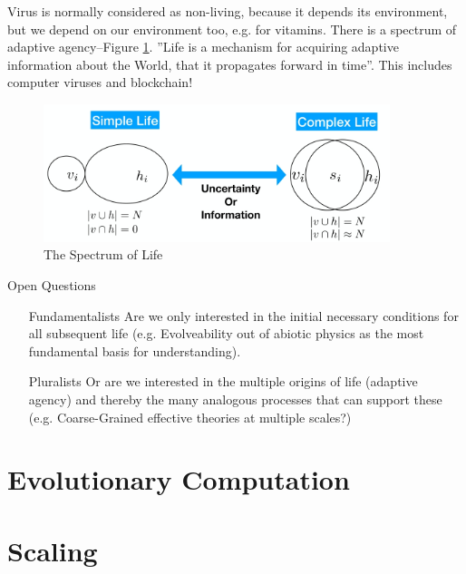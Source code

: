 \documentclass[]{article}
\begin{document}
 Virus is normally considered as non-living, because it depends its environment, but we depend on our environment too, e.g. for vitamins. There is a spectrum of adaptive agency--Figure \ref{fig:SpectrumOfLife}.  ''Life is a mechanism for acquiring adaptive information about the World, that it propagates forward in time''. This includes computer viruses and blockchain!
 
\begin{figure}[H]
	\caption{The Spectrum of Life}\label{fig:SpectrumOfLife}
	\includegraphics[width=0.9\textwidth]{SpectrumOfLife}
\end{figure}
Open Questions

\begin{itemize}
	\item[Fundamentalists] Are we only interested in the initial necessary conditions for all subsequent life (e.g. Evolveability out of abiotic physics as the most fundamental basis for understanding).
	\item[Pluralists] Or are we interested in the multiple origins of life (adaptive agency) and thereby the many analogous processes that can support these (e.g. 	Coarse-Grained effective theories at multiple scales?)
\end{itemize}
\section{Evolutionary Computation}

\cite{mitchell1998introduction}
\cite{eiben2003introduction}
\cite{holland1992adaptation}
\cite{forrest1993genetic}
\cite{ma2014novo}
\cite{marshall2014evolution}


\section{Scaling}

\cite{anderson2013altered}
\cite{damuth1981population}
\cite{enquist1998allometric}
\cite{enquist2012land}
\cite{marquet2005scaling}
\cite{schmidt1984scaling}
\cite{tucker2014evolutionary}
\cite{west1997general}
\end{document}
